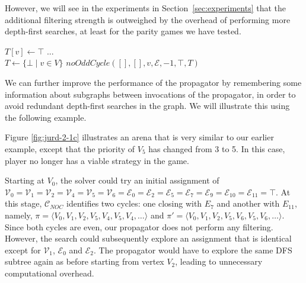 \documentclass[a4paper,UKenglish,cleveref, autoref, thm-restate, anonymous]{lipics-v2021}
\begin{document}
However, we will see in the experiments in Section~\ref{sec:experiments} that the additional filtering strength is outweighed by the overhead of performing more depth-first searches, at least for the parity games we have tested.%

\begin{algorithm}
    \caption{Implementation of \noc searching for potential new odd cycles ($\mathsf{MultiStart}$)}
    \small
    \begin{algorithmic}[1]
        \State $T[v] \gets \top$
        \State ...
    \EndFunction
    \\
        \State $T \gets \{\bot \mid v \in V\}$
            \State $noOddCycle([],[],v,\mathcal{E},-1,\top,T)$
        \EndWhile
    \EndFunction
    \end{algorithmic}
    \label{alg:no-odd-cycle-f2}
\end{algorithm}

We can further improve the performance of the propagator by remembering some information about subgraphs between invocations of the propagator, in order to avoid redundant depth-first searches in the graph. We will illustrate this using the following example.

\begin{example}\label{exa:jurd-2-1-f3}
Figure \ref{fig:jurd-2-1c} illustrates an arena that is very similar to our earlier example, except that the priority of $V_5$ has changed from 3 to 5. In this case, player \odd no longer has a viable strategy in the game. 
 
Starting at $V_0$, the solver could try an initial assignment of $\mathcal{V}_0 = \mathcal{V}_1 = \mathcal{V}_2 = \mathcal{V}_4 = \mathcal{V}_5 = \mathcal{V}_6 = \mathcal{E}_0 = \mathcal{E}_2 = \mathcal{E}_5 = \mathcal{E}_7 = \mathcal{E}_9 = \mathcal{E}_{10} = \mathcal{E}_{11} = \top$. At this stage, $\mathcal{C}_{NOC}$ identifies two cycles: one closing with $E_7$ and another with $E_{11}$, namely, $\pi = \langle V_0,V_1,V_2,V_5,V_4,V_5,V_4,\dots\rangle$ and $\pi' = \langle V_0,V_1,V_2,V_5,V_6,V_5,V_6,\dots\rangle$. Since both cycles are even, our propagator does not perform any filtering.  However, the search could subsequently explore an assignment that is identical except for $\mathcal{V}_1$, $\mathcal{E}_0$ and $\mathcal{E}_2$. The propagator would have to explore the same DFS subtree again as before starting from vertex $V_2$, leading to unnecessary computational overhead.

\end{example}
\end{document}
